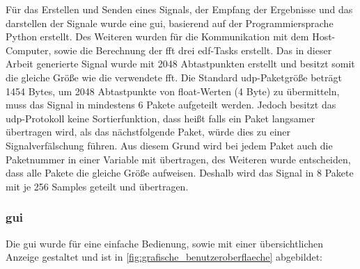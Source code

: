 \documentclass[../EDF Master Thesis.tex]{subfiles}
\begin{document}
        Für das Erstellen und Senden eines Signals, der Empfang der Ergebnisse und das darstellen der Signale wurde eine \ac{gui}, basierend auf der Programmiersprache Python erstellt.
        Des Weiteren wurden für die Kommunikation mit dem Host-Computer, sowie die Berechnung der \ac{fft} drei \ac{edf}-Tasks erstellt.
        Das in dieser Arbeit generierte Signal wurde mit 2048 Abtastpunkten erstellt und besitzt somit die gleiche Größe wie die verwendete \ac{fft}.
        Die Standard \ac{udp}-Paketgröße beträgt 1454 Bytes, um 2048 Abtastpunkte von float-Werten (4 Byte) zu übermitteln, muss das Signal in mindestens 6 Pakete aufgeteilt werden.
        Jedoch besitzt das \ac{udp}-Protokoll keine Sortierfunktion, dass heißt falls ein Paket langsamer übertragen wird, als das nächstfolgende Paket, würde dies zu einer Signalverfälschung führen.
        Aus diesem Grund wird bei jedem Paket auch die Paketnummer in einer Variable mit übertragen, des Weiteren wurde entscheiden, dass alle Pakete die gleiche Größe aufweisen.
        Deshalb wird das Signal in 8 Pakete mit je 256 Samples geteilt und übertragen.

        \clearpage
        \subsubsection{\acf{gui}}
            Die \ac{gui} wurde für eine einfache Bedienung, sowie mit einer übersichtlichen Anzeige gestaltet und ist in \autoref{fig:grafische_benutzeroberflaeche} abgebildet:
\end{document}

